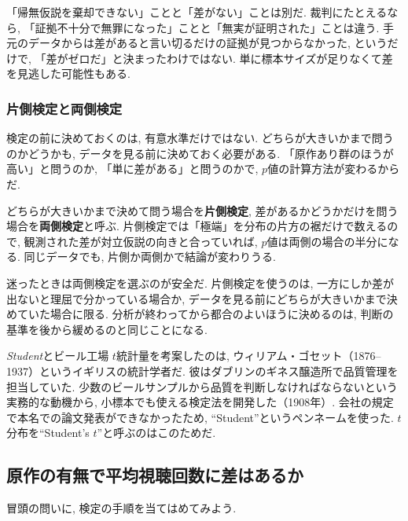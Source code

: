     「帰無仮説を棄却できない」ことと「差がない」ことは別だ.
    裁判にたとえるなら, 「証拠不十分で無罪になった」ことと「無実が証明された」ことは違う.
    手元のデータからは差があると言い切るだけの証拠が見つからなかった, というだけで, 「差がゼロだ」と決まったわけではない.
    単に標本サイズが足りなくて差を見逃した可能性もある.

    \subsubsection*{片側検定と両側検定}

    検定の前に決めておくのは, 有意水準だけではない.
    どちらが大きいかまで問うのかどうかも, データを見る前に決めておく必要がある.
    「原作あり群のほうが高い」と問うのか, 「単に差がある」と問うのかで, $p$値の計算方法が変わるからだ.

    どちらが大きいかまで決めて問う場合を\textbf{片側検定}, 差があるかどうかだけを問う場合を\textbf{両側検定}と呼ぶ.
    片側検定では「極端」を分布の片方の裾だけで数えるので, 観測された差が対立仮説の向きと合っていれば, $p$値は両側の場合の半分になる.
    同じデータでも, 片側か両側かで結論が変わりうる.

    迷ったときは両側検定を選ぶのが安全だ.
    片側検定を使うのは, 一方にしか差が出ないと理屈で分かっている場合か, データを見る前にどちらが大きいかまで決めていた場合に限る.
    分析が終わってから都合のよいほうに決めるのは, 判断の基準を後から緩めるのと同じことになる.

    \begin{mybox}{\textit{Student}とビール工場}
      $t$統計量を考案したのは, ウィリアム・ゴセット（1876--1937）というイギリスの統計学者だ.\footnotemark
      彼はダブリンのギネス醸造所で品質管理を担当していた.
      少数のビールサンプルから品質を判断しなければならないという実務的な動機から,
      小標本でも使える検定法を開発した（1908年）.
      会社の規定で本名での論文発表ができなかったため, ``Student''というペンネームを使った.
      $t$分布を``Student's $t$''と呼ぶのはこのためだ.
    \end{mybox}


  \subsection{原作の有無で平均視聴回数に差はあるか}

    冒頭の問いに, 検定の手順を当てはめてみよう.


